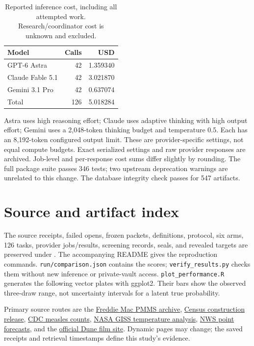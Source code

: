 \documentclass[11pt]{article}
\begin{document}
\begin{table}[htbp]\centering
\caption{Reported inference cost, including all attempted work. Research/coordinator cost is unknown and excluded.}
\begin{tabular}{lrr}\toprule
Model & Calls & USD\\\midrule
GPT-6 Astra & 42 & 1.359340\\
Claude Fable 5.1 & 42 & 3.021870\\
Gemini 3.1 Pro & 42 & 0.637074\\
\midrule Total & 126 & 5.018284\\\bottomrule
\end{tabular}
\end{table}

Astra uses high reasoning effort; Claude uses adaptive thinking with high output
effort; Gemini uses a 2,048-token thinking budget and temperature 0.5. Each has
an 8,192-token configured output limit. These are provider-specific settings,
not equal compute budgets. Exact serialized settings and raw provider responses
are archived. Job-level and per-response cost sums differ slightly by rounding.
The full package suite passes 346 tests; two upstream deprecation warnings are
unrelated to this change. The database integrity check passes for 547 artifacts.

\section{Source and artifact index}
The source receipts, failed opens, frozen packets, definitions, protocol, six
arms, 126 tasks, provider jobs/results, screening records, seals, and revealed
targets are preserved under
. The accompanying README gives the
reproduction commands. \texttt{run/comparison.json} contains the scores;
\texttt{verify\_results.py} checks them without new inference or private-vault
access. \texttt{plot\_performance.R} generates the following vector plates
with ggplot2. Their bars show the observed three-draw range, not uncertainty
intervals for a latent true probability.

Primary source routes are the
\href{https://www.freddiemac.com/pmms/archive}{Freddie Mac PMMS archive},
\href{https://www.census.gov/construction/nrc/current/}{Census construction release},
\href{https://www.cdc.gov/measles/data-research/index.html}{CDC measles counts},
\href{https://data.giss.nasa.gov/gistemp/}{NASA GISS temperature analysis},
\href{https://forecast.weather.gov/}{NWS point forecasts}, and the
\href{https://www.dunemovie.com/}{official Dune film site}. Dynamic pages may
change; the saved receipts and retrieval timestamps define this study's evidence.
\clearpage

\end{document}
